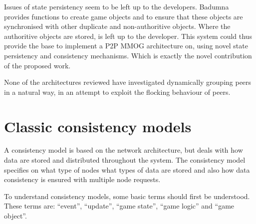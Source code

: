 \documentclass[journal,oneside,a4paper,onecolumn]{IEEEtran}
\begin{document}
Issues of state persistency seem to be left up to the developers. Badumna provides functions to create game objects and to ensure that these objects are synchronised with other duplicate and non-authoritive objects. Where the authoritive objects are stored, is left up to the developer. This system could thus provide the base to implement a P2P MMOG architecture on, using novel state persistency and consistency mechanisms. Which is exactly the novel contribution of the proposed work.

None of the architectures reviewed have investigated dynamically grouping peers in a natural way, in an attempt to exploit the flocking behaviour of peers.



\section{Classic consistency models}
\label{consistency_models}

A consistency model is based on the network architecture, but deals with how data are stored and distributed throughout the system. The consistency model specifies on what type of nodes what types of data are stored and also how data consistency is ensured with multiple node requests.

To understand consistency models, some basic terms should first be understood. These terms are: ``event'', ``update'', ``game state'', ``game logic'' and ``game object''.
\end{document}
